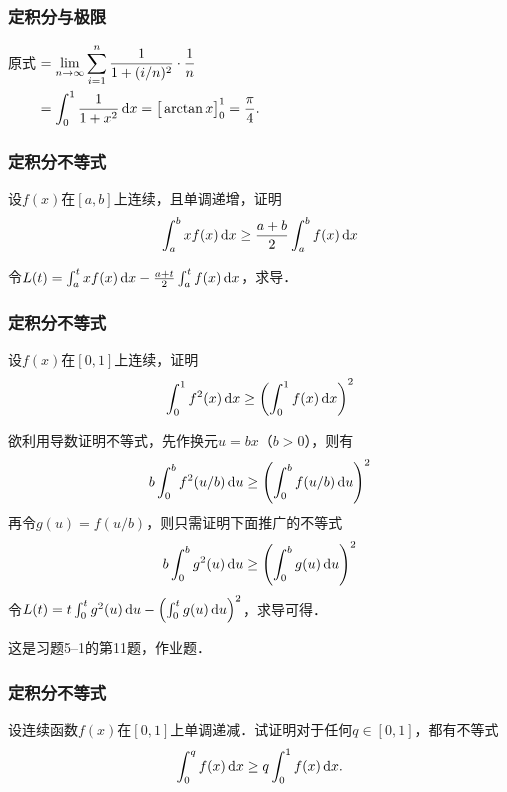 \documentclass[14pt,notheorems,leqno,xcolor={rgb}]{beamer} %
\begin{document}
\begin{jframe}
\frametitle{定积分与极限}
\begin{solution}
原式\unskip$\begin{aligned}[t]
&=\lim\limits_{n\to\infty}\sum_{i=1}^{n}\frac1{1+(i/n)^2}\cdot\frac1n\\
&=\int_0^1 \frac1{1+x^2}\mathop{}\!\mathrm{d}{x}=\big[\arctan x\big]_0^1=\frac{\pi}{4}.
\end{aligned}$
\end{solution}
\end{jframe}

\begin{frame}
\frametitle{定积分不等式}
\begin{puzzle}
设$f(x)$在$[a,b]$上连续，且单调递增，证明
\[\int_a^b xf(x)\mathop{}\!\mathrm{d} x \ge \frac{a+b}{2}\int_a^b f(x) \mathop{}\!\mathrm{d} x \]
\end{puzzle}
\vpause
\begin{solution}
令$L(t)=\int_a^t xf(x)\mathop{}\!\mathrm{d} x - \frac{a+t}{2}\int_a^t f(x) \mathop{}\!\mathrm{d} x$，求导．
\end{solution}
\end{frame}

\begin{iframe}
\frametitle{定积分不等式}
\begin{puzzle}
设$f(x)$在$[0,1]$上连续，证明
\[\int_0^1 f^2(x)\mathop{}\!\mathrm{d} x \ge \left(\int_0^1 f(x) \mathop{}\!\mathrm{d} x \right)^2 \]
\end{puzzle}
\end{iframe}

\begin{sframe}
\begin{solution}
欲利用导数证明不等式，先作换元$u=bx$（$b>0$），则有
\[ b\int_0^b f^2(u/b)\mathop{}\!\mathrm{d} u \ge \left(\int_0^b f(u/b)\mathop{}\!\mathrm{d} u \right)^2 \]
再令$g(u)=f(u/b)$，则只需证明下面推广的不等式
\[ b\int_0^b g^2(u)\mathop{}\!\mathrm{d} u \ge \left(\int_0^b g(u)\mathop{}\!\mathrm{d} u \right)^2 \]
令$L(t)=t\int_0^t g^2(u)\mathop{}\!\mathrm{d} u -\left(\int_0^t g(u)\mathop{}\!\mathrm{d} u \right)^2$，求导可得．
\end{solution}
\vpause
\begin{remark*}
这是习题5--1的第11题，作业题．
\end{remark*}
\end{sframe}

\begin{iframe}
\frametitle{定积分不等式}
\begin{puzzle}
设连续函数$f(x)$在$[0,1]$上单调递减．试证明对于任何$q\in[0,1]$，都有不等式
$$\int_0^q f(x)\mathop{}\!\mathrm{d} x \ge q\int_0^1 f(x)\mathop{}\!\mathrm{d} x.$$
\end{puzzle}
\end{iframe}
\end{document}
